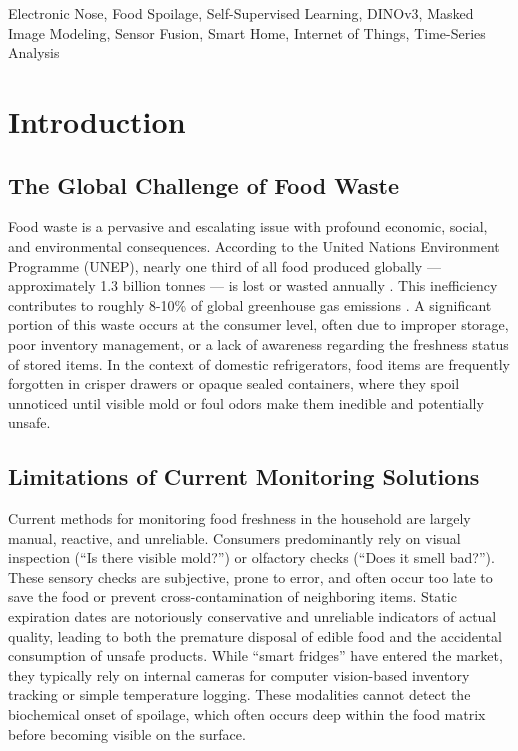 \documentclass[conference]{IEEEtran}
\begin{document}
    \begin{IEEEkeywords}
        Electronic Nose, Food Spoilage, Self-Supervised Learning, DINOv3, Masked Image Modeling, Sensor Fusion, Smart Home, Internet of Things, Time-Series Analysis
    \end{IEEEkeywords}

    \section{Introduction}

    \subsection{The Global Challenge of Food Waste}
    Food waste is a pervasive and escalating issue with profound economic, social, and environmental consequences. According to the United Nations Environment Programme (UNEP), nearly one third of all food produced globally — approximately 1.3 billion tonnes — is lost or wasted annually \cite{unep2021}. This inefficiency contributes to roughly 8-10\% of global greenhouse gas emissions \cite{ipcc2019}. A significant portion of this waste occurs at the consumer level, often due to improper storage, poor inventory management, or a lack of awareness regarding the freshness status of stored items. In the context of domestic refrigerators, food items are frequently forgotten in crisper drawers or opaque sealed containers, where they spoil unnoticed until visible mold or foul odors make them inedible and potentially unsafe.

    \subsection{Limitations of Current Monitoring Solutions}
    Current methods for monitoring food freshness in the household are largely manual, reactive, and unreliable. Consumers predominantly rely on visual inspection (``Is there visible mold?'') or olfactory checks (``Does it smell bad?''). These sensory checks are subjective, prone to error, and often occur too late to save the food or prevent cross-contamination of neighboring items. Static expiration dates are notoriously conservative and unreliable indicators of actual quality, leading to both the premature disposal of edible food and the accidental consumption of unsafe products. While ``smart fridges'' have entered the market, they typically rely on internal cameras for computer vision-based inventory tracking or simple temperature logging. These modalities cannot detect the biochemical onset of spoilage, which often occurs deep within the food matrix before becoming visible on the surface.
\end{document}
